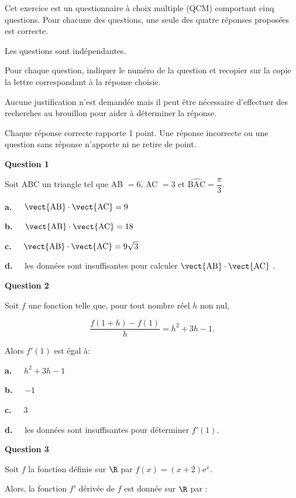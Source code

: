\medskip

Cet exercice est un questionnaire à choix multiple (QCM) comportant cinq questions. Pour chacune des questions, une seule des quatre réponses proposées est correcte.

Les questions sont indépendantes.

Pour chaque question, indiquer le numéro de la question et recopier sur la copie la lettre correspondant à la réponse choisie.

Aucune justification n'est demandée mais il peut être nécessaire d'effectuer des recherches au brouillon pour aider à déterminer la réponse.

Chaque réponse correcte rapporte 1 point. Une réponse incorrecte ou une question sans réponse n'apporte ni ne retire de point.

\medskip

\textbf{Question 1}

\medskip

Soit ABC un triangle tel que AB $= 6$, AC $= 3$ et $\widehat{\text{BAC}} = \dfrac{\pi}{3}$.

\textbf{a.~~} $\vect{\text{AB}} \cdot  \vect{\text{AC}} = 9$

\textbf{b.~~} $\vect{\text{AB}} \cdot  \vect{\text{AC}} = 18$

\textbf{c.~~} $\vect{\text{AB}} \cdot  \vect{\text{AC}}= 9\sqrt{3}$

\textbf{d.~~} les données sont insuffisantes pour calculer $\vect{\text{AB}} \cdot \vect{\text{AC}}$
.
\medskip

\textbf{Question 2}

\medskip

Soit $f$ une fonction telle que, pour tout nombre réel $h$ non nul,

\[\dfrac{f(1 + h) - f(1)}{h} =  h^2 + 3h - 1.\]

Alors $f'(1)$ est égal à:

\textbf{a.~~} $h^2 + 3h - 1$

\textbf{b.~~} $- 1$

\textbf{c.~~} 3

\textbf{d.~~} les données sont insuffisantes pour déterminer $f'(1)$.

\medskip

\textbf{Question 3}

\medskip

Soit $f$ la fonction définie sur $\R$ par $f(x) = (x + 2)\text{e}^x$.

Alors, la fonction $f'$ dérivée de $f$  est donnée sur $\R$ par :

